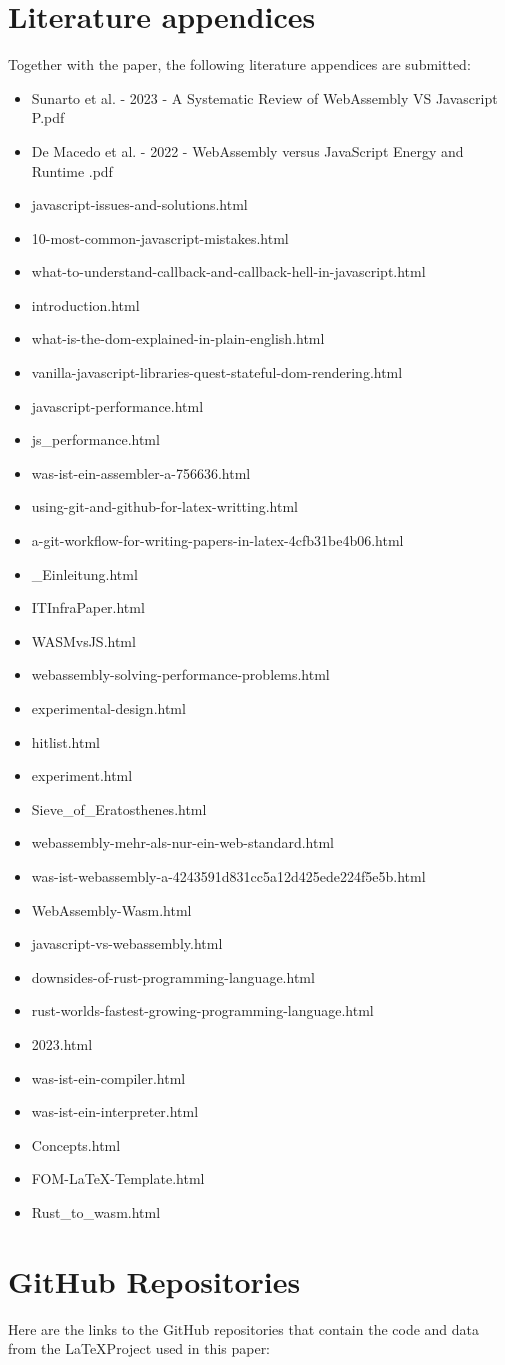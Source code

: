 \section{Literature appendices}
Together with the paper, the following literature appendices are submitted:

\begin{itemize}
    \item Sunarto et al. - 2023 - A Systematic Review of WebAssembly VS Javascript P.pdf
    \item De Macedo et al. - 2022 - WebAssembly versus JavaScript Energy and Runtime .pdf
    \item javascript-issues-and-solutions.html
    \item 10-most-common-javascript-mistakes.html
    \item what-to-understand-callback-and-callback-hell-in-javascript.html
    \item introduction.html
    \item what-is-the-dom-explained-in-plain-english.html
    \item vanilla-javascript-libraries-quest-stateful-dom-rendering.html
    \item javascript-performance.html
    \item js_performance.html
    \item was-ist-ein-assembler-a-756636.html
    \item using-git-and-github-for-latex-writting.html
    \item a-git-workflow-for-writing-papers-in-latex-4cfb31be4b06.html
    \item _Einleitung.html
    \item ITInfraPaper.html
    \item WASMvsJS.html
    \item webassembly-solving-performance-problems.html
    \item experimental-design.html
    \item hitlist.html
    \item experiment.html
    \item Sieve_of_Eratosthenes.html
    \item webassembly-mehr-als-nur-ein-web-standard.html
    \item was-ist-webassembly-a-4243591d831cc5a12d425ede224f5e5b.html
    \item WebAssembly-Wasm.html
    \item javascript-vs-webassembly.html
    \item downsides-of-rust-programming-language.html
    \item rust-worlds-fastest-growing-programming-language.html
    \item 2023.html
    \item was-ist-ein-compiler.html
    \item was-ist-ein-interpreter.html
    \item Concepts.html
    \item FOM-LaTeX-Template.html
    \item Rust_to_wasm.html
\end{itemize}

\section{GitHub Repositories}
Here are the links to the GitHub repositories that contain the code and data from the \LaTeX Project used in this paper: